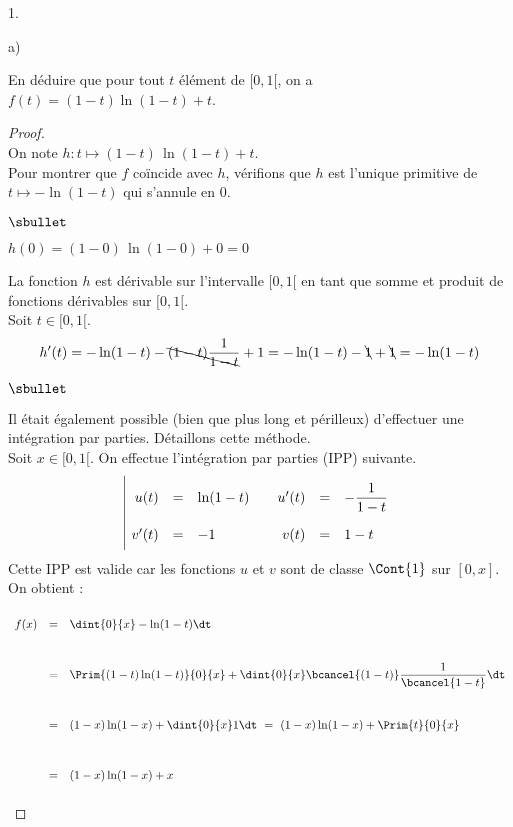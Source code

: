 \documentclass[11pt]{article}%
\begin{document}
\begin{noliste}{1.}
\begin{noliste}{a)}
  
  
  \newpage
  
  
  \item En déduire que pour tout $t$ élément de $[0,1[$, on a $f(t)= 
  (1-t)\ln(1-t)+t$. 
  
  \begin{proof}~\\
    On note $h:t\mapsto (1-t) \, \ln(1-t)+t$.\\
    Pour montrer que $f$ coïncide avec $h$, vérifions que $h$ est
    l'unique primitive de $t \mapsto -\ln(1-t)$ qui s'annule en $0$.
    \begin{noliste}{$\sbullet$}
      \item $h(0)=(1-0) \, \ln(1-0) +0=0$
      \item La fonction $h$ est dérivable sur l'intervalle $[0,1[$ en 
      tant que somme et produit de fonctions dérivables sur $[0,1[$.\\
      Soit $t\in [0,1[$.
      \[
        h'(t) = -\ln(1-t) -\bcancel{(1-t)} \dfrac{1}{\bcancel{1-t}}
        +1 = -\ln(1-t) -\bcancel{1} + \bcancel{1} = - \ln(1-t)
      \]
    \end{noliste}
    
    \begin{remark}
    \begin{noliste}{$\sbullet$}
      \item Il était également possible (bien que plus long et 
      périlleux) d'effectuer une intégration par parties. Détaillons 
      cette méthode.\\
      Soit $x\in [0,1[$. On effectue l'intégration par parties 
      (IPP) suivante.
      \[
	\renewcommand{\arraystretch}{2.2}
	\begin{array}{|rcl@{\qquad}rcl}
	  u(t) & = & \ln(1-t) & u'(t) & = & -\dfrac{1}{1-t} \\
	  v'(t) & = & -1 & v(t) & = & 1-t
	\end{array}
      \]
      Cette IPP est valide car les fonctions $u$ et $v$ sont de classe 
      $\Cont{1}$ sur $[0,x]$. On obtient :
      \[
        \begin{array}{rcl}
          f(x) &=& \dint{0}{x} - \ln(1-t) \dt 
          \\[.6cm]
          &=& \Prim{(1-t) \ln(1-t)}{0}{x}
          + \dint{0}{x} \bcancel{(1-t)}\dfrac{1}{\bcancel{1-t}} \dt
          \\[.6cm]
          &=& (1-x) \ln(1-x) + \dint{0}{x} 1 \dt
          \ = \ (1-x) \ln(1-x) + \Prim{t}{0}{x}
          \\[.6cm]
          &=& (1-x) \ln(1-x) + x
        \end{array}
      \]
      

\end{noliste}
\end{remark}
\end{proof}
\end{noliste}
\end{noliste}
\end{document}
